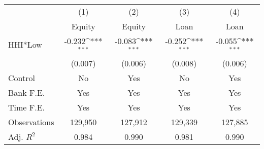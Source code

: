 {
\def\sym#1{\ifmmode^{#1}\else\(^{#1}\)\fi}
\begin{tabular*}{\hsize}{@{\hskip\tabcolsep\extracolsep\fill}l*{4}{c}}
\hline\hline
                    &\multicolumn{1}{c}{(1)}&\multicolumn{1}{c}{(2)}&\multicolumn{1}{c}{(3)}&\multicolumn{1}{c}{(4)}\\
                    &\multicolumn{1}{c}{Equity}&\multicolumn{1}{c}{Equity}&\multicolumn{1}{c}{Loan}&\multicolumn{1}{c}{Loan}\\
\hline
HHI*Low             &      -0.232\sym{***}&      -0.083\sym{***}&      -0.252\sym{***}&      -0.055\sym{***}\\
                    &     (0.007)         &     (0.006)         &     (0.008)         &     (0.006)         \\
\hline
Control             &          No         &         Yes         &          No         &         Yes         \\
Bank F.E.           &         Yes         &         Yes         &         Yes         &         Yes         \\
Time F.E.           &         Yes         &         Yes         &         Yes         &         Yes         \\
Observations        &     129,950         &     127,912         &     129,339         &     127,885         \\
Adj. \(R^{2}\)      &       0.984         &       0.990         &       0.981         &       0.990         \\
\hline\hline
\end{tabular*}
}
